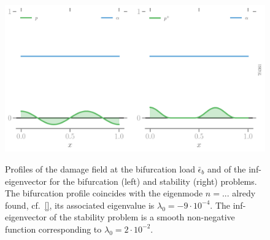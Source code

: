 \begin{figure}[htbp]
    \centering
    \includegraphics*[width=.95\textwidth]{../images/profiles-bif-stab-7f4361886184f3c6791fe16bf4f4b3f2.pdf}
    \label{fig:irreversibility}
    \caption{Profiles of the damage field at the bifurcation load $\bar \epsilon_b$ and of the inf-eigenvector for the bifurcation (left) and stability (right) problems. The bifurcation profile coincides with the eigenmode $n=...$ alredy found, cf.~\eqref{}, its associated eigenvalue is $\lambda_0 = -9\cdot 10^{-4}$. The inf-eigenvector of the stability problem is a smooth non-negative function corresponding to $\lambda_0=2\cdot 10^{-2}$.}
\end{figure}
